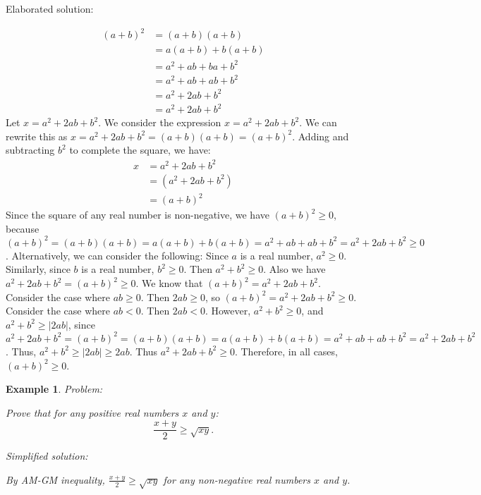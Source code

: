 \documentclass{article}
\newtheorem{example}{Example}
\begin{document}
Elaborated solution:
\begin{tcolorbox}[colback=green!10, width=\linewidth]
\begin{align*} (a+b)^2 &= (a+b)(a+b) \\ &= a(a+b) + b(a+b) \\ &= a^2 + ab + ba + b^2 \\ &= a^2 + ab + ab + b^2 \\ &= a^2 + 2ab + b^2 \\ &= a^2 + 2ab + b^2\end{align*} 
Let $x = a^2 + 2ab + b^2$. We consider the expression $x = a^2 + 2ab + b^2$. We can rewrite this as $x = a^2 + 2ab + b^2 = (a+b)(a+b) = (a+b)^2$.
Adding and subtracting $b^2$ to complete the square, we have:
\begin{align*} x &= a^2 + 2ab + b^2 \\ &= (a^2 + 2ab + b^2) \\ &= (a+b)^2\end{align*} 
Since the square of any real number is non-negative, we have $(a+b)^2 \ge 0$, because $(a+b)^2 = (a+b)(a+b) = a(a+b) + b(a+b) = a^2 + ab + ab + b^2 = a^2 + 2ab + b^2 \ge 0$.  Alternatively, we can consider the following:
Since $a$ is a real number, $a^2 \ge 0$. Similarly, since $b$ is a real number, $b^2 \ge 0$.
Then $a^2 + b^2 \ge 0$. Also we have $a^2 + 2ab + b^2 = (a+b)^2 \ge 0$.
We know that $ (a+b)^2 = a^2 + 2ab + b^2 $.
Consider the case where $ab \ge 0$. Then $2ab \ge 0$, so $(a+b)^2 = a^2 + 2ab + b^2 \ge 0$.
Consider the case where $ab < 0$. Then $2ab < 0$. However, $a^2 + b^2 \ge 0$, and  $a^2 + b^2 \ge |2ab|$, since $a^2 + 2ab + b^2 = (a+b)^2 = (a+b)(a+b) = a(a+b) + b(a+b) = a^2 + ab + ab + b^2 = a^2 + 2ab + b^2$.
Thus, $ a^2 + b^2 \ge |2ab| \ge 2ab$. Thus $a^2 + 2ab + b^2 \ge 0$.
Therefore, in all cases, $(a+b)^2 \ge 0$.

\end{tcolorbox}



\begin{example}
Problem:
\begin{tcolorbox}[colback=yellow!10, width=\linewidth]
Prove that for any positive real numbers $x$ and $y$:
    $$\frac{x+y}{2} \geq \sqrt{xy}.$$
\end{tcolorbox}

Simplified solution:
\begin{tcolorbox}[colback=blue!10, width=\linewidth]
By AM-GM inequality, $\frac{x+y}{2} \ge \sqrt{xy}$ for any non-negative real numbers $x$ and $y$.

\end{tcolorbox}
\end{example}
\end{document}

